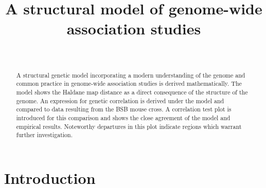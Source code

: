\documentclass[sts]{imsart}
\begin{document}
\begin{frontmatter}
\title{A structural model of genome-wide association studies}

\begin{aug}
\author[A]{~}%
\address[A]{Chris Salahub is a PhD Candidate in Statistics, Statistics
  and Actuarial Science, University of Waterloo, Waterloo,
  Canada.}
\end{aug}

\begin{abstract}
A structural genetic model incorporating a modern understanding of the genome and common practice in genome-wide association studies is derived mathematically. The model shows the Haldane map distance as a direct consequence of the structure of the genome. An expression for genetic correlation is derived under the model and compared to data resulting from the BSB mouse cross. A correlation test plot is introduced for this comparison and shows the close agreement of the model and empirical results. Noteworthy departures in this plot indicate regions which warrant further investigation.
\end{abstract}

\begin{keyword}
\end{keyword}

\end{frontmatter}

\section{Introduction} \label{sec:intro}
\end{document}
